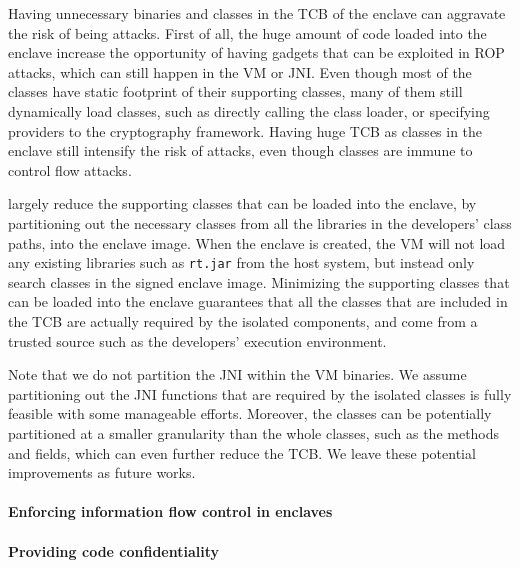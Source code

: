 Having unnecessary binaries and classes in the TCB of the enclave
can aggravate the risk of being attacks.
First of all, the huge amount of code loaded into the enclave
increase the opportunity of having gadgets that can be exploited in ROP attacks,  
which can still happen in the \java{} VM or JNI.
Even though most of the \java{} classes have static footprint of their supporting classes,
many of them still dynamically load classes, such as directly calling the class loader, or specifying providers to the \java{} cryptography framework.
Having huge TCB as \java{} classes in the enclave still intensify
the risk of attacks, even though \java{} classes are immune to control flow attacks. 

\sysname{} largely reduce the supporting classes that can be loaded into the enclave,
by partitioning out the necessary classes from all the libraries in the developers' class paths, into the enclave image.
When the enclave is created, the \java{} VM will not load any existing libraries such as {\tt rt.jar} from the host system,
but instead only search classes in the signed enclave image.
Minimizing the supporting classes that can be loaded into the enclave
guarantees that all the classes that are included in the TCB
are actually required by the isolated components,
and come from a trusted source such as the developers' execution environment. 

Note that we do not partition the JNI within the \java{} VM binaries.
We assume partitioning out the JNI functions that are required by the isolated classes
is fully feasible with some manageable efforts.
Moreover, the \java{} classes can be potentially partitioned at a smaller granularity than the whole classes, such as the methods and fields, which can even further reduce the TCB.
We leave these potential improvements as future works. 

\paragraph{Enforcing information flow control in enclaves}


\paragraph{Providing code confidentiality}
